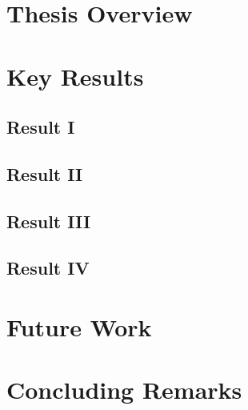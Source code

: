 \section{Thesis Overview}

\section{Key Results}
\subsection{Result I}
\subsection{Result II}
\subsection{Result III}
\subsection{Result IV}

\section{Future Work}
\section{Concluding Remarks}
